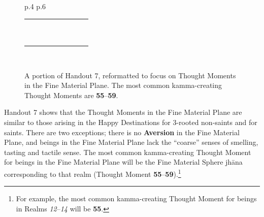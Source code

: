 \begin{figure}[H]
\begin{tabular}{L{\dimexpr.4\tabcolsep} R{\dimexpr.6\tabcolsep}}
\begin{tabular}{p{} p{}
p{}
R{.077\textwidth} |
p{.039\textwidth}
p{.039\textwidth}
p{.039\textwidth}
p{.039\textwidth}
p{.039\textwidth}}
\\
& &  &  & & & & &
\\
& &  &  & & & & & \tm
\\\midrule
{} &  &  &  & \tm & & & &
\\
& &  &  & & \tm & & &
\\
& &  &  & & & \tm & &
\\
& &  &  & & & & \tm &
\\
&  &  &  & & \tm & & &
\\
& &  &  & & & \tm & &
\\
& &  &  & & & & \tm &
\\
& &  &  & & & & & \tm
\\
\bottomrule
\end{tabular}
\\
\end{tabular}
\caption{A portion of Handout 7, reformatted to focus on Thought Moments in the Fine Material Plane. The most common kamma-creating Thought Moments are \textbf{55}--\textbf{59}.}
\label{fig:Fine}
\end{figure}

Handout 7 shows that the Thought Moments in the Fine Material Plane are similar to those arising in the Happy Destinations for 3-rooted non-saints and for saints. There are two exceptions; there is no \textbf{Aversion} in the Fine Material Plane, and beings in the Fine Material Plane lack the “coarse” senses of smelling, tasting and tactile sense. The most common kamma-creating Thought Moment for beings in the Fine Material Plane will be the Fine Material Sphere jhāna corresponding to that realm (Thought Moment \textbf{55}--\textbf{59}).\footnote{For example, the most common kamma-creating Thought Moment for beings in Realms \textit{12}--\textit{14} will be \textbf{55}.}

